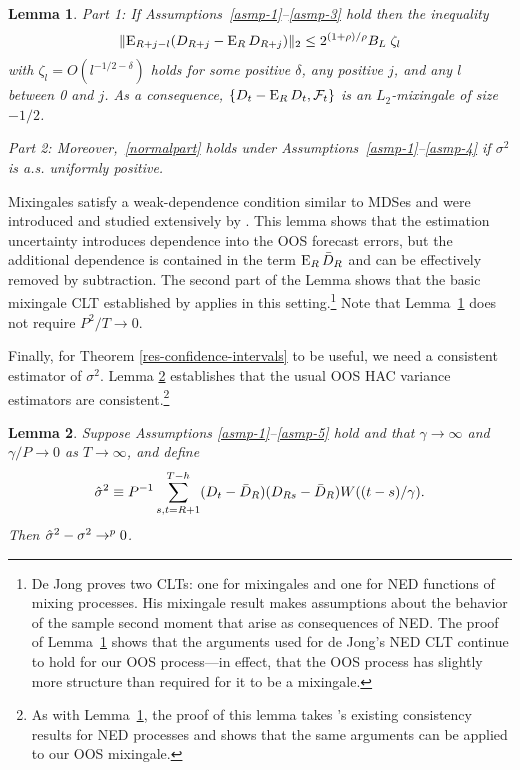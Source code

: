 \documentclass[11pt]{article}
\newtheorem{lem}{Lemma}
\newcommand{\citepos}[1]{\citeauthor{#1}'s \citeyearpar{#1}}
\begin{document}
\begin{lem}\label{res-mixingale}
  Part 1: If Assumptions~\ref{asmp-1}--\ref{asmp-3} hold then the
  inequality
  \begin{equation}\label{mixingaleR}
    \lVert \operatorname{E}_{R+j-l}(D_{R+j} - \operatorname{E}_R D_{R+j}) \rVert_2 \leq
    2^{(1+\rho)/\rho} B_L \; \zeta_l
  \end{equation}
  with $\zeta_l = O(l^{-1/2 - \delta})$ holds for some positive
  $\delta$, any positive $j$, and any $l$ between 0 and $j$.  As a
  consequence, $\{D_t - \operatorname{E}_R D_t, \mathcal F_t\}$ is an
  $L_2$-mixingale of size $-1/2$.

  \noindent Part 2: Moreover,~\eqref{normalpart} holds under
  Assumptions~\ref{asmp-1}--\ref{asmp-4} if $\sigma^2$ is
  a.s. uniformly positive.
\end{lem}

Mixingales satisfy a weak-dependence condition similar to MDSes and
were introduced and studied extensively by
\citet{Mcl:74,Mcl:75,Mcl:75b,Mcl:77}.  This lemma shows that the
estimation uncertainty introduces dependence into the OOS forecast
errors, but the additional dependence is contained in the term $\operatorname{E}_R
\bar{D}_{R}$ and can be effectively removed by subtraction.  The second part
of the Lemma shows that the basic mixingale CLT established by
\citet{Jon:97} applies in this setting.\footnote{De Jong proves two
  CLTs: one for mixingales and one for NED functions of mixing
  processes.  His mixingale result makes assumptions about the
  behavior of the sample second moment that arise as consequences of
  NED.  The proof of Lemma~\ref{res-mixingale} shows that the
  arguments used for de Jong's NED CLT continue to hold for our
  OOS process---in effect, that the OOS process has slightly more
  structure than required for it to be a mixingale.}  Note that
Lemma~\ref{res-mixingale} does not require $P^2/T \to 0$.

Finally, for Theorem \ref{res-confidence-intervals} to be useful, we
need a consistent estimator of $\sigma^2$. Lemma
\ref{res-variance-estimator} establishes that the usual OOS HAC
variance estimators are consistent.\footnote{As with
      Lemma~\ref{res-mixingale}, the proof of this lemma takes
      \citepos{JoD:00} existing consistency results
      for NED processes and shows that the same arguments can be
      applied to our OOS mixingale.}

\begin{lem}
  \label{res-variance-estimator} Suppose Assumptions
  \ref{asmp-1}--\ref{asmp-5} hold and that $\gamma \to \infty$ and
  $\gamma/P \to 0$ as $T \to \infty$, and define
  \begin{equation*}
    \hat{\sigma}^2 \equiv P^{-1} \sum_{s,t=R+1}^{T-h} (D_t - \bar{D}_{R})(D_{Rs} - \bar{D}_{R})
    W((t-s)/\gamma).
  \end{equation*}
  Then $\hat{\sigma}^2 - \sigma^2 \to^p 0$.
\end{lem}
\end{document}
